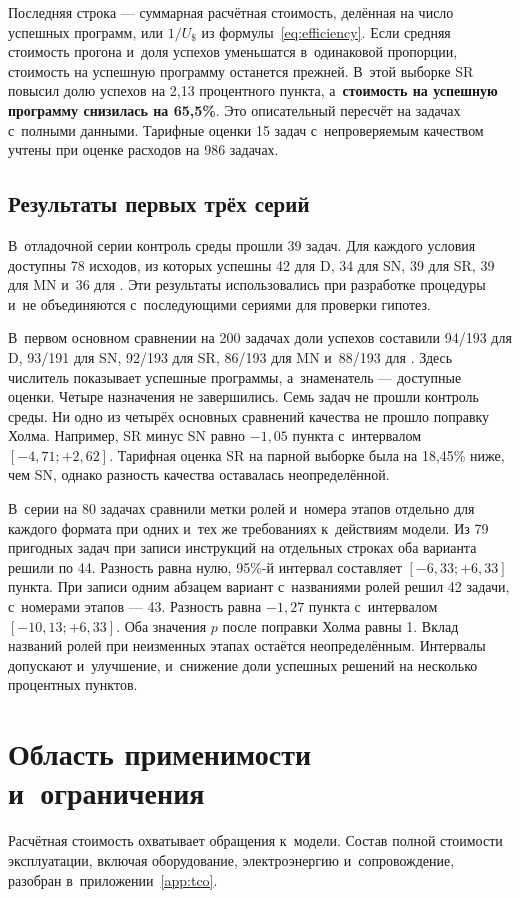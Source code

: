 Последняя строка --- суммарная расчётная стоимость, делённая на число успешных программ, или $1/U_{\$}$ из формулы~\eqref{eq:efficiency}. Если средняя стоимость прогона и~доля успехов уменьшатся в~одинаковой пропорции, стоимость на успешную программу останется прежней. В~этой выборке SR повысил долю успехов на 2,13 процентного пункта, а~\textbf{стоимость на успешную программу снизилась на 65,5\%}. Это описательный пересчёт на задачах с~полными данными. Тарифные оценки 15 задач с~непроверяемым качеством учтены при оценке расходов на 986 задачах.

\subsection{Результаты первых трёх серий}
В~отладочной серии контроль среды прошли 39 задач. Для каждого условия доступны 78 исходов, из которых успешны 42 для D, 34 для SN, 39 для SR, 39 для MN и~36 для \MultiCallRole{}. Эти результаты использовались при разработке процедуры и~не объединяются с~последующими сериями для проверки гипотез.

В~первом основном сравнении на 200 задачах доли успехов составили 94/193 для D, 93/191 для SN, 92/193 для SR, 86/193 для MN и~88/193 для \MultiCallRole{}. Здесь числитель показывает успешные программы, а~знаменатель --- доступные оценки. Четыре назначения не завершились. Семь задач не прошли контроль среды. Ни одно из четырёх основных сравнений качества не прошло поправку Холма. Например, SR минус SN равно $-1{,}05$ пункта с~интервалом $[-4{,}71;+2{,}62]$. Тарифная оценка SR на парной выборке была на 18,45\% ниже, чем SN, однако разность качества оставалась неопределённой.

В~серии на 80 задачах сравнили метки ролей и~номера этапов отдельно для каждого формата при одних и~тех же требованиях к~действиям модели. Из 79 пригодных задач при записи инструкций на отдельных строках оба варианта решили по 44. Разность равна нулю, 95\%-й интервал составляет $[-6{,}33;+6{,}33]$ пункта. При записи одним абзацем вариант с~названиями ролей решил 42 задачи, с~номерами этапов --- 43. Разность равна $-1{,}27$ пункта с~интервалом $[-10{,}13;+6{,}33]$. Оба значения $p$ после поправки Холма равны 1. Вклад названий ролей при неизменных этапах остаётся неопределённым. Интервалы допускают и~улучшение, и~снижение доли успешных решений на несколько процентных пунктов. 


\section{Область применимости и~ограничения}\label{sec:limits}
Расчётная стоимость охватывает обращения к~модели. Состав полной стоимости эксплуатации, включая оборудование, электроэнергию и~сопровождение, разобран в~приложении~\ref{app:tco}.

